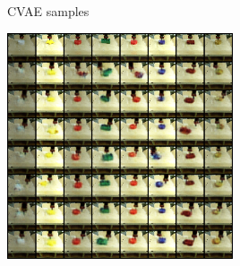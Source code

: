 \documentclass{article}
\begin{document}
\begin{figure}
    \begin{subfigure}[b]{0.16\textwidth}
        \center
        CVAE samples \vspace{1.5cm}
    \end{subfigure}
    \begin{subfigure}[b]{0.4\textwidth}
        \center
         {
        }
    \end{subfigure}
    \hspace{0.1cm}
    \begin{subfigure}[b]{0.4\textwidth}
        \center
         {
        \includegraphics[height=252.5px]{img/cvae_samples_real_pusher3b.png}
        }
    \end{subfigure}
    \vspace{0.1cm}


\end{figure}
\end{document}
